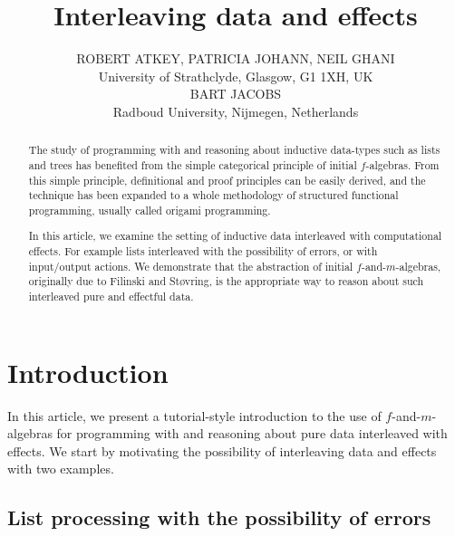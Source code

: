 \documentclass{jfp1}
\title{Interleaving data and effects}
\author[R. Atkey, P. Johann, N. Ghani, B. Jacobs]
       {ROBERT ATKEY, PATRICIA JOHANN, NEIL GHANI \\
         University of Strathclyde, Glasgow, G1 1XH, UK\\
         \vspace{0.3cm}
         BART JACOBS \\
         Radboud University, Nijmegen, Netherlands}
\begin{document}
\label{firstpage}

\maketitle

\begin{abstract}
  The study of programming with and reasoning about inductive
  data-types such as lists and trees has benefited from the simple
  categorical principle of initial $f$-algebras. From this simple
  principle, definitional and proof principles can be easily derived,
  and the technique has been expanded to a whole methodology of
  structured functional programming, usually called origami
  programming.

  In this article, we examine the setting of inductive data
  interleaved with computational effects. For example lists
  interleaved with the possibility of errors, or with input/output
  actions. We demonstrate that the abstraction of initial
  $f$-and-$m$-algebras, originally due to Filinski and St\o{}vring, is
  the appropriate way to reason about such interleaved pure and
  effectful data.
\end{abstract}

\section{Introduction}

In this article, we present a tutorial-style introduction to the use
of $f$-and-$m$-algebras for programming with and reasoning about pure
data interleaved with effects. We start by motivating the possibility
of interleaving data and effects with two examples.

\subsection{List processing with the possibility of errors}
\label{sec:list-proc-with-errors}
\end{document}
